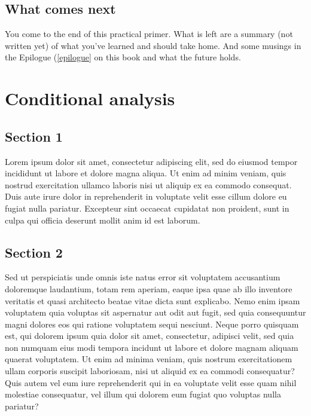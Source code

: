 \documentclass[
]{book}
\begin{document}
\hypertarget{what-comes-next}{%
\section{What comes next}\label{what-comes-next}}

You come to the end of this practical primer. What is left are a summary (not written yet) of what you've learned and should take home. And some musings in the Epilogue (\ref{epilogue} on this book and what the future holds.

\hypertarget{conditional_analysis}{%
\chapter{Conditional analysis}\label{conditional_analysis}}

\hypertarget{section-1}{%
\section{Section 1}\label{section-1}}

Lorem ipsum dolor sit amet, consectetur adipiscing elit, sed do eiusmod tempor incididunt ut labore et dolore magna aliqua. Ut enim ad minim veniam, quis nostrud exercitation ullamco laboris nisi ut aliquip ex ea commodo consequat. Duis aute irure dolor in reprehenderit in voluptate velit esse cillum dolore eu fugiat nulla pariatur. Excepteur sint occaecat cupidatat non proident, sunt in culpa qui officia deserunt mollit anim id est laborum.

\hypertarget{section-2}{%
\section{Section 2}\label{section-2}}

Sed ut perspiciatis unde omnis iste natus error sit voluptatem accusantium doloremque laudantium, totam rem aperiam, eaque ipsa quae ab illo inventore veritatis et quasi architecto beatae vitae dicta sunt explicabo. Nemo enim ipsam voluptatem quia voluptas sit aspernatur aut odit aut fugit, sed quia consequuntur magni dolores eos qui ratione voluptatem sequi nesciunt. Neque porro quisquam est, qui dolorem ipsum quia dolor sit amet, consectetur, adipisci velit, sed quia non numquam eius modi tempora incidunt ut labore et dolore magnam aliquam quaerat voluptatem. Ut enim ad minima veniam, quis nostrum exercitationem ullam corporis suscipit laboriosam, nisi ut aliquid ex ea commodi consequatur? Quis autem vel eum iure reprehenderit qui in ea voluptate velit esse quam nihil molestiae consequatur, vel illum qui dolorem eum fugiat quo voluptas nulla pariatur?
\end{document}
